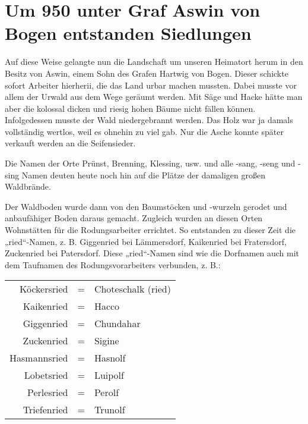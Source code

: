 \documentclass[12pt,a4paper]{book}
\begin{document}
\section{Um 950 unter Graf Aswin von Bogen entstanden Siedlungen}

Auf diese Weise gelangte nun die Landschaft um unseren Heimatort herum
in den Besitz von Aswin, einem Sohn des Grafen Hartwig von Bogen. Dieser
schickte sofort Arbeiter hierherii, die das Land urbar machen mussten.
Dabei musste vor allem der Urwald aus dem Wege geräumt werden. Mit Säge
und Hacke hätte man aber die kolossal dicken und riesig hohen Bäume
nicht fällen können. Infolgedessen musste der Wald niedergebrannt
werden. Das Holz war ja damals vollständig wertlos, weil es ohnehin zu
viel gab. Nur die Asche konnte später verkauft werden an die
Seifensieder.

Die Namen der Orte Prünst, Brenning, Klessing, usw. und alle -sang,
-seng und -sing Namen deuten heute noch hin auf die Plätze der damaligen
großen Waldbrände.

Der Waldboden wurde dann von den Baumstöcken und -wurzeln gerodet und
anbaufähiger Boden daraus gemacht. Zugleich wurden an diesen Orten
Wohnstätten für die Rodungsarbeiter errichtet. So entstanden zu dieser
Zeit die „ried“-Namen, z. B. Giggenried bei Lämmersdorf, Kaikenried bei
Fratersdorf, Zuckenried bei Patersdorf. Diese „ried“-Namen sind wie die
Dorfnamen auch mit dem Taufnamen des Rodungsvorarbeiters verbunden, z.
B.:

\begin{center}
\begin{tabular}{rcl}
Köckersried & = & Choteschalk (ried) \\

Kaikenried & = & Hacco \\

Giggenried & = & Chundahar \\

Zuckenried & = & Sigine \\

Hasmannsried & = & Hasnolf \\

Lobetsried & = & Luipolf \\

Perlesried & = & Perolf \\

Triefenried & = & Trunolf \\
\end{tabular}
\end{center}
\end{document}

